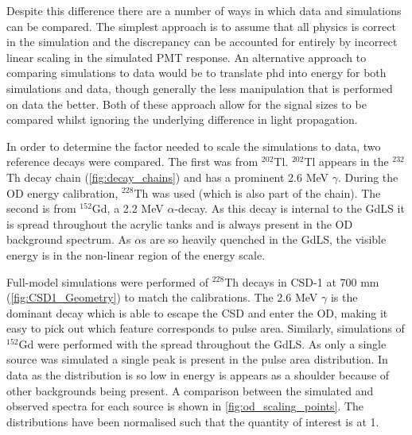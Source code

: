 

\par
Despite this difference there are a number of ways in which data and simulations can be compared.
The simplest approach is to assume that all physics is correct in the simulation and the discrepancy can be accounted for entirely by incorrect linear scaling in the simulated PMT response.
An alternative approach to comparing simulations to data would be to translate phd into energy for both simulations and data, though generally the less manipulation that is performed on data the better.
Both of these approach allow for the signal sizes to be compared whilst ignoring the underlying difference in light propagation.

\par
In order to determine the factor needed to scale the simulations to data, two reference decays were compared.
The first was from ${}^{202}$Tl.
${}^{202}$Tl appears in the ${}^{232}$Th decay chain (\autoref{fig:decay_chains}) and has a prominent 2.6 MeV $\gamma$.
During the OD energy calibration, ${}^{228}$Th was used (which is also part of the chain).
The second is from ${}^{152}$Gd, a 2.2 MeV $\alpha$-decay.
As this decay is internal to the GdLS it is spread throughout the acrylic tanks and is always present in the OD background spectrum.
As $\alpha$s are so heavily quenched in the GdLS, the visible energy is in the non-linear region of the energy scale.

\par
Full-model simulations were performed of ${}^{228}$Th decays in CSD-1 at 700 mm (\autoref{fig:CSD1_Geometry}) to match the calibrations.
The 2.6 MeV $\gamma$ is the dominant decay which is able to escape the CSD and enter the OD, making it easy to pick out which feature corresponds to pulse area.
Similarly, simulations of ${}^{152}$Gd were performed with the spread throughout the GdLS.
As only a single source was simulated a single peak is present in the pulse area distribution.
In data as the distribution is so low in energy is appears as a shoulder because of other backgrounds being present.
A comparison between the simulated and observed spectra for each source is shown in \autoref{fig:od_scaling_points}.
The distributions have been normalised such that the quantity of interest is at 1.


